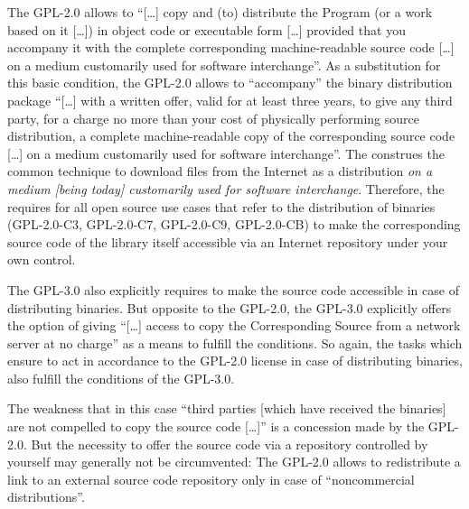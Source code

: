 The GPL-2.0 allows to \enquote{[\ldots] copy and (to) distribute the Program (or
a work based on it [\ldots]) in object code or executable form [\ldots] provided
that you accompany it with the complete corresponding machine-readable source
code [\ldots] on a medium customarily used for software
interchange}. As a substitution for this basic condition,
the GPL-2.0 allows to \enquote{accompany} the binary distribution package
\enquote{[\ldots] with a written offer, valid for at least three years, to give
any third party, for a charge no more than your cost of physically performing
source distribution, a complete machine-readable copy of the corresponding
source code [\ldots] on a medium customarily used for software
interchange}. The \oslic{} construes the common technique to
download files from the Internet as a distribution \emph{on a medium [being
today] customarily used for software interchange}. Therefore, the \oslic{} requires
for all open source use cases that refer to the distribution of binaries
(GPL-2.0-C3, GPL-2.0-C7, GPL-2.0-C9, GPL-2.0-CB) to make the corresponding
source code of the library itself accessible via an Internet repository under
your own control. 
  
\label{Gpl3CondCopyleft}
The GPL-3.0 also explicitly requires to make the source code accessible in case
of distributing binaries. But opposite to the GPL-2.0, the GPL-3.0 explicitly
offers the option of giving \enquote{[\ldots] access to copy the Corresponding
Source from a network server at no charge} as a means to fulfill the
conditions. So again, the tasks which ensure to act in
accordance to the GPL-2.0 license in case of distributing binaries, also fulfill
the conditions of the GPL-3.0.

The weakness that in this case \enquote{third parties [which have received the
binaries] are not compelled to copy the source code [\ldots]} is a concession
made by the GPL-2.0. But the necessity to offer the
source code via a repository controlled by yourself may generally not be
circumvented: The GPL-2.0 allows to redistribute a link to an external source
code repository only in case of \enquote{noncommercial
distributions}. 
  
